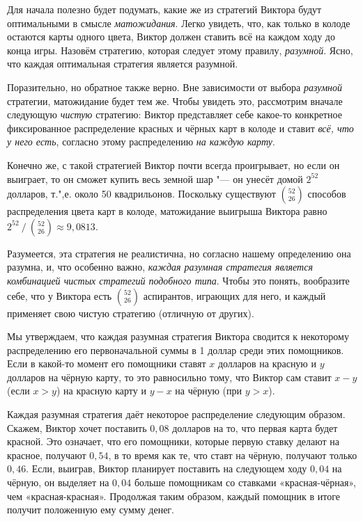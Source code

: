 \documentclass[twoside]{book}
\begin{document}
\medskip

Для начала полезно будет подумать, какие же из стратегий Виктора будут оптимальными в смысле \emph{матожидания}.
Легко увидеть, что, как только в колоде остаются карты одного цвета, Виктор должен ставить всё на каждом ходу до конца игры.
Назовём стратегию, которая следует этому правилу, \emph{разумной}.
Ясно, что каждая оптимальная стратегия является разумной.

Поразительно, но обратное также верно.
Вне зависимости от выбора \emph{разумной} стратегии, матожидание будет тем же.
Чтобы увидеть это, рассмотрим вначале следующую \emph{чистую} стратегию: Виктор представляет себе какое-то конкретное фиксированное распределение красных и чёрных карт в колоде и ставит \emph{всё, что у него есть}, согласно этому распределению \emph{на каждую карту}.

Конечно же, с такой стратегией Виктор почти всегда проигрывает, но если он выиграет, то он сможет купить весь земной шар "--- он унесёт домой $2^{52}$ долларов, т.",е. около 50 квадрильонов.
Поскольку существуют $\binom{52}{26}$ способов распределения цвета карт в колоде, матожидание выигрыша Виктора равно $2^{52}\mathbin/\binom{52}{26} \approx 9{,}0813$.

Разумеется, эта стратегия не реалистична, но согласно нашему определению она разумна, и, что особенно важно, \emph{каждая разумная стратегия является комбинацией чистых стратегий подобного типа}.
Чтобы это понять, вообразите себе, что у Виктора есть $\binom{52}{26}$ аспирантов, играющих для него, и каждый применяет свою чистую стратегию (отличную от других).

Мы утверждаем, что каждая разумная стратегия Виктора сводится к некоторому распределению  его первоначальной суммы в 1 доллар среди этих помощников.
Если в какой-то момент его помощники ставят $x$ долларов на красную и $y$ долларов на чёрную карту, то это равносильно тому, что Виктор сам ставит $x-y$ (если $x > y$) на красную карту и $y-x$ на чёрную (при $y>x$).

Каждая разумная стратегия даёт некоторое распределение следующим образом.
Скажем, Виктор хочет поставить $0{,}08$ долларов на то, что первая карта будет красной.
Это означает, что его помощники, которые первую ставку делают на красное, получают $0{,}54$, в то время как те, что ставт на чёрную, получают только $0{,}46$.
Если, выиграв, Виктор планирует поставить на следующем ходу $0{,}04$ на чёрную, он выделяет на $0{,}04$ больше помощникам со ставками «красная-чёрная», чем «красная-красная».
Продолжая таким образом, каждый помощник в итоге получит положенную ему сумму денег.
\end{document}
